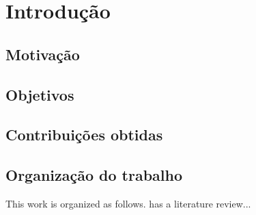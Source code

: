 \chapter{Introdução}
\label{chp:intro}

\section{Motivação}

\section{Objetivos}

\section{Contribuições obtidas}

\section{Organização do trabalho}

This work is organized as follows.  has a literature review...